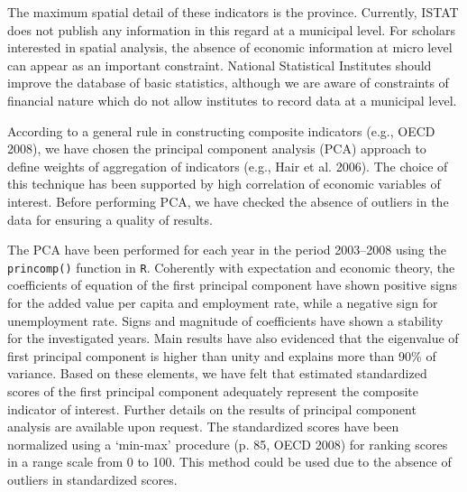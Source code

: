 \documentclass[10pt]{article}
\theoremstyle{definition}
\theoremstyle{plain}
\begin{document}
The maximum spatial detail of these indicators is the province. Currently, ISTAT does not publish any information in this regard at a municipal level. For scholars interested in spatial analysis, the absence of economic information at micro level can appear as an important constraint. National Statistical Institutes should improve the database of basic statistics, although we are aware of constraints of financial nature which do not allow institutes to record data at a municipal level.

According to a general rule in constructing composite indicators (e.g., OECD 2008), we have chosen the principal component analysis (PCA) approach to define weights of aggregation of indicators (e.g., Hair et al. 2006). The choice of this technique has been supported by high correlation of economic variables of interest. Before performing PCA, we have checked the absence of outliers in the data for ensuring a quality of results.

The PCA have been performed for each year in the period 2003--2008 using the \texttt{princomp()} function in \texttt{R}. Coherently with expectation and economic theory, the coefficients of equation of the first principal component have shown positive signs for the added value per capita and employment rate, while a negative sign for unemployment rate. Signs and magnitude of coefficients have shown a stability for the investigated years. Main results have also evidenced that the eigenvalue of first principal component is higher than unity and explains more than 90\% of variance. Based on these elements, we have felt that estimated standardized scores of the first principal component adequately represent the composite indicator of interest. Further details on the results of principal component analysis are available upon request. The standardized scores have been normalized using a `min-max' procedure (p. 85, OECD 2008) for ranking scores in a range scale from 0 to 100. This method could be used due to the absence of outliers in standardized scores.
 
\end{document}
